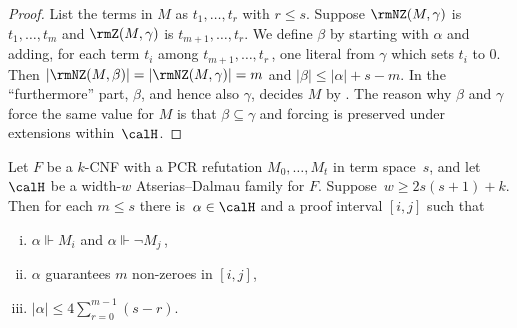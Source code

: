 \documentclass{toc}
\begin{document}
\begin{proof}
List the terms in $M$ as $t_1, \dots, t_r$ with $r \le s$.
Suppose $\rmNZ(M, \gamma)$ is $t_1, \dots, t_m$ and 
$\rmZ(M, \gamma)$ is $t_{m+1}, \dots, t_r$.
We define $\beta$ by starting with $\alpha$ and adding, for 
each term $t_i$ among $t_{m+1}, \dots, t_r$\,, one literal from $\gamma$ which sets $t_i$ to $0$.
Then  $|\rmNZ(M, \beta)|=|\rmNZ(M, \gamma)| = m$ and $|\beta| \le |\alpha|+s-m$.
In the ``furthermore'' part, $\beta$, and hence also $\gamma$,
decides $M$ by  . 
The reason why $\beta$ and $\gamma$ force the same value for $M$ 
is that \mbox{$\beta \subseteq \gamma$} and
forcing is preserved under extensions within~$\calH$.
\end{proof}


\begin{lemma}\label{lem:main} 
Let $F$ be a $k$-CNF with a PCR refutation
$M_0, \ldots, M_t$ in term space~$s$, 
and let $\calH$ be a width-$w$ Atserias--Dalmau family for $F$.
Suppose~$w \ge 2s(s+1)+k$.
Then for each $m \le s$ there is~$\alpha \in \calH$ 
and a proof interval $[i,j]$ such that
\begin{enumerate}[(i)]
\item 
$\alpha \Vdash M_{i}$ and  $\alpha \Vdash \neg M_{j}$\,,
\item 
$\alpha$ guarantees $m$ non-zeroes in $[i,j]$,
\item 
$|\alpha| \le \displaystyle {4\sum_{r=0}^{m-1} (s - r)}$.
\end{enumerate}
\end{lemma}
\end{document}
